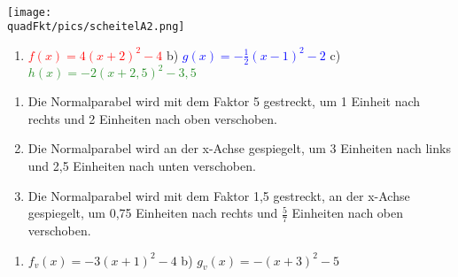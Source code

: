 \begin{Answer}[ref=scheitelformA2]\\
	\begin{minipage}{\linewidth}\centering
		\texttt{[image: \\quadFkt/pics/scheitelA2.png]}
	\end{minipage}\vspace{.1cm}
	\begin{enumerate}[label=\alph*)]
		\item \textcolor{red}{$f(x)=4\left(x+2\right)^2-4$}
		\quad b) \textcolor{blue}{$g(x)=-\tfrac{1}{2}\left(x-1\right)^2-2$} \quad c) \textcolor{ForestGreen}{$h(x)=-2\left(x+2,5\right)^2-3,5$}
	\end{enumerate}
\end{Answer}
\begin{Answer}[ref=scheitelformA3]
	\begin{enumerate}[label=\alph*)]
		\item Die Normalparabel wird mit dem Faktor 5 gestreckt, um 1 Einheit nach rechts und 2 Einheiten nach oben verschoben.
		\item Die Normalparabel wird an der x-Achse gespiegelt, um 3 Einheiten nach links und 2,5 Einheiten nach unten verschoben.
		\item Die Normalparabel wird mit dem Faktor 1,5 gestreckt, an der x-Achse gespiegelt, um 0,75 Einheiten nach rechts und $\tfrac{5}{7}$ Einheiten nach oben verschoben.
	\end{enumerate}
\end{Answer}
\begin{Answer}[ref=scheitelformA4]
	\begin{enumerate}[label=\alph*)]
		\item $f_v(x)=-3\left(x+1\right)^2-4$ \quad b) $g_v(x)=-\left(x+3\right)^2-5$
	\end{enumerate}
\end{Answer}\newpage